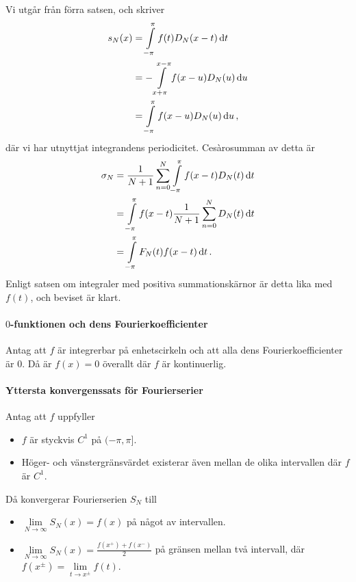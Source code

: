 \proof
Vi utgår från förra satsen, och skriver
\begin{align*}
	s_{N}(x) &= \int\limits_{-\pi}^{\pi}f(t)D_{N}(x - t)\dd{t} \\
	         &= -\int\limits_{x + \pi}^{x - \pi}f(x - u)D_{N}(u)\dd{u} \\
	         &= \int\limits_{-\pi}^{\pi}f(x - u)D_{N}(u)\dd{u},
\end{align*}
där vi har utnyttjat integrandens periodicitet. Cesàrosumman av detta är
\begin{align*}
	\sigma_{N} &= \frac{1}{N + 1}\sum\limits_{n = 0}^{N}\int\limits_{-\pi}^{\pi}f(x - t)D_{N}(t)\dd{t} \\
	           &= \int\limits_{-\pi}^{\pi}f(x - t)\frac{1}{N + 1}\sum\limits_{n = 0}^{N}D_{N}(t)\dd{t} \\
	           &= \int\limits_{-\pi}^{\pi}F_{N}(t)f(x - t)\dd{t}.
\end{align*}
Enligt satsen om integraler med positiva summationskärnor är detta lika med $f(t)$, och beviset är klart.

\paragraph{$0$-funktionen och dens Fourierkoefficienter}
Antag att $f$ är integrerbar på enhetscirkeln och att alla dens Fourierkoefficienter är $0$. Då är $f(x) = 0$ överallt där $f$ är kontinuerlig.

\proof

\paragraph{Yttersta konvergenssats för Fourierserier}
Antag att $f$ uppfyller
\begin{itemize}
	\item $f$ är styckvis $C^{1}$ på $(-\pi, \pi]$.
	\item Höger- och vänstergränsvärdet existerar även mellan de olika intervallen där $f$ är $C^{1}$.
\end{itemize}
Då konvergerar Fourierserien $S_{N}$ till
\begin{itemize}
	\item $\lim\limits_{N\to\infty}S_{N}(x) = f(x)$ på något av intervallen.
	\item $\lim\limits_{N\to\infty}S_{N}(x) = \frac{f(x^{+}) + f(x^{-})}{2}$ på gränsen mellan två intervall, där $f(x^{\pm}) = \lim\limits_{t\to x^{\pm}}f(t)$.
\end{itemize}

